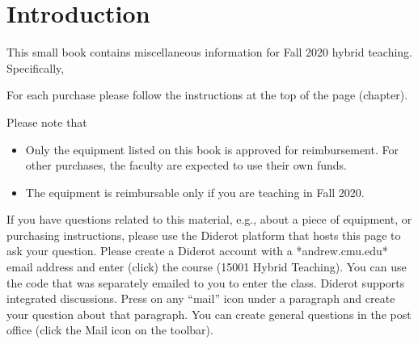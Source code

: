 \chapter{Introduction}
\label{ch:intro}

\begin{gram}
\label{ch:intro::preamble}

This small book contains miscellaneous information for Fall 2020 hybrid teaching.  
%
Specifically,
%
\end{gram}

\begin{gram}
\label{ch:intro::purchase}
For each purchase please follow the instructions at the top of the
page (chapter).

%
Please note that 
\begin{itemize}
\item 
Only the equipment listed on this book is approved for reimbursement.
For other purchases, the faculty are expected to use their own funds.

\item 
The equipment is reimbursable only if you are teaching in Fall 2020.

\end{itemize}
%
\end{gram}

\begin{important}
If you have questions related to this material, e.g.,  about a piece of equipment, or purchasing instructions, please use the Diderot platform that hosts this page to ask your question.   
%
Please create a Diderot account  with a *andrew.cmu.edu* email address and enter (click)  the course (15001 Hybrid Teaching).  You can use the code that was separately emailed to you to enter the class. 
%
Diderot supports integrated discussions.  Press on any “mail” icon under a paragraph and create your question about that paragraph.  You can create general questions in the post office (click the Mail icon on the toolbar).
\end{important}

